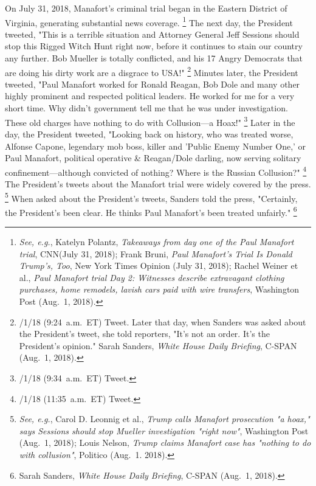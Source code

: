 {On July 31, 2018, Manafort's criminal trial began in the Eastern District of Virginia, generating substantial news coverage.%
\footnote{\textit{See, e.g.}, Katelyn Polantz, \textit{Takeaways from day one of the Paul Manafort trial}, CNN(July 31, 2018);
Frank Bruni, \textit{Paul Manafort's Trial Is Donald Trump's, Too}, New York Times Opinion (July 31, 2018);
Rachel Weiner et al., \textit{Paul Manafort trial Day 2: Witnesses describe extravagant clothing purchases, home remodels, lavish cars paid with wire transfers}, Washington Post (Aug.~1, 2018).}
The next day, the President tweeted, "This is a terrible situation and Attorney General Jeff Sessions should stop this Rigged Witch Hunt right now, before it continues to stain our country any further.
Bob Mueller is totally conflicted, and his 17 Angry Democrats that are doing his dirty work are a disgrace to USA!"%
\footnote{/1/18 (9:24~a.m.~ET) Tweet.
Later that day, when Sanders was asked about the President's tweet, she told reporters, "It's not an order.
It's the President's opinion."
Sarah Sanders, \textit{White House Daily Briefing}, C-SPAN (Aug.~1, 2018).}
Minutes later, the President tweeted, "Paul Manafort worked for Ronald Reagan, Bob Dole and many other highly prominent and respected political leaders.
He worked for me for a very short time.
Why didn't government tell me that he was under investigation.
These old charges have nothing to do with Collusion---a Hoax!"%
\footnote{/1/18 (9:34~a.m.~ET) Tweet.}
Later in the day, the President tweeted, "Looking back on history, who was treated worse, Alfonse Capone, legendary mob boss, killer and 'Public Enemy Number One,' or Paul Manafort, political operative \& Reagan/Dole darling, now serving solitary confinement---although convicted of nothing?
Where is the Russian Collusion?"%
\footnote{/1/18 (11:35~a.m.~ET) Tweet.}
The President's tweets about the Manafort trial were widely covered by the press.%
\footnote{\textit{See, e.g.}, Carol D. Leonnig et al., \textit{Trump calls Manafort prosecution "a hoax," says Sessions should stop Mueller investigation "right now"}, Washington Post (Aug.~1, 2018);
Louis Nelson, \textit{Trump claims Manafort case has "nothing to do with collusion"}, Politico (Aug.~1. 2018).}
When asked about the President's tweets, Sanders told the press, "Certainly, the President's been clear.
He thinks Paul Manafort's been treated unfairly."%
\footnote{Sarah Sanders, \textit{White House Daily Briefing}, C-SPAN (Aug.~1, 2018).}

}
